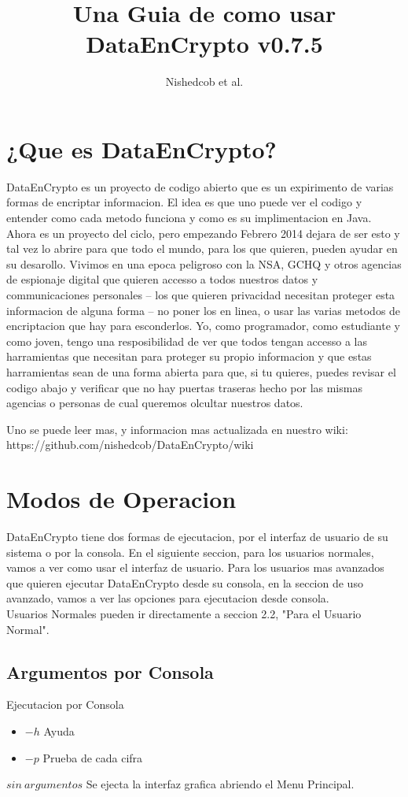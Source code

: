 \documentclass{article}
\author{Nishedcob et al.}
\title{Una Guia de como usar DataEnCrypto v0.7.5}
\begin{document}
	\maketitle
	\tableofcontents
	\section{¿Que es DataEnCrypto?}
		DataEnCrypto es un proyecto de codigo abierto que es un expirimento de varias formas de encriptar informacion. El idea es que uno puede ver el codigo y entender como cada metodo funciona y como es su implimentacion en Java. Ahora es un proyecto del ciclo, pero empezando Febrero 2014 dejara de ser esto y tal vez lo abrire para que todo el mundo, para los que quieren, pueden ayudar en su desarollo. Vivimos en una epoca peligroso con la NSA, GCHQ y otros agencias de espionaje digital que quieren accesso a todos nuestros datos y communicaciones personales -- los que quieren privacidad necesitan proteger esta informacion de alguna forma -- no poner los en linea, o usar las varias metodos de encriptacion que hay para esconderlos. Yo, como programador, como estudiante y como joven, tengo una resposibilidad de ver que todos tengan accesso a las harramientas que necesitan para proteger su propio informacion y que estas harramientas sean de una forma abierta para que, si tu quieres, puedes revisar el codigo abajo y verificar que no hay puertas traseras hecho por las mismas agencias o personas de cual queremos olcultar nuestros datos.

		Uno se puede leer mas, y informacion mas actualizada en nuestro wiki: https://github.com/nishedcob/DataEnCrypto/wiki
	\section{Modos de Operacion}
		DataEnCrypto tiene dos formas de ejecutacion, por el interfaz de usuario de su sistema o por la consola. En el siguiente seccion, para los usuarios normales, vamos a ver como usar el interfaz de usuario. Para los usuarios mas avanzados que quieren ejecutar DataEnCrypto desde su consola, en la seccion de uso avanzado, vamos a ver las opciones para ejecutacion desde consola. \\
		Usuarios Normales pueden ir directamente a seccion 2.2, "Para el Usuario Normal".
		\subsection{Argumentos por Consola}
			Ejecutacion por Consola
			\begin{itemize}
				\item $-h$ Ayuda
				\item $-p$ Prueba de cada cifra
			\end{itemize}
			$sin\ argumentos$ Se ejecta la interfaz grafica abriendo el Menu Principal. \\
\end{document}
